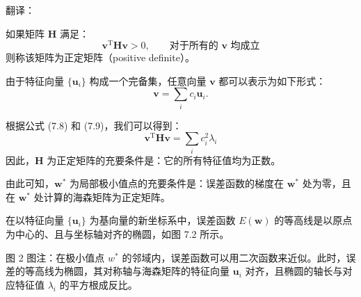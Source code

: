 \documentclass{article}
\begin{document}
{\color{red}
翻译：

如果矩阵 $\mathbf{H}$ 满足：
\begin{equation}
\mathbf{v}^\mathrm{T} \mathbf{H} \mathbf{v} > 0, \qquad \text{对于所有的 } \mathbf{v} \text{ 均成立}
\tag{7.12}
\end{equation}
则称该矩阵为正定矩阵（positive definite）。

由于特征向量 $\{\mathbf{u}_i\}$ 构成一个完备集，任意向量 $\mathbf{v}$ 都可以表示为如下形式：
\begin{equation}
\mathbf{v} = \sum_i c_i \mathbf{u}_i.
\tag{7.13}
\end{equation}

根据公式 (7.8) 和 (7.9)，我们可以得到：
\begin{equation}
\mathbf{v}^\mathrm{T} \mathbf{H} \mathbf{v} = \sum_i c_i^2 \lambda_i
\tag{7.14}
\end{equation}
因此，$\mathbf{H}$ 为正定矩阵的充要条件是：它的所有特征值均为正数。

由此可知，$\mathbf{w}^*$ 为局部极小值点的充要条件是：误差函数的梯度在 $\mathbf{w}^*$ 处为零，且在 $\mathbf{w}^*$ 处计算的海森矩阵为正定矩阵。

在以特征向量 $\{\mathbf{u}_i\}$ 为基向量的新坐标系中，误差函数 $E(\mathbf{w})$ 的等高线是以原点为中心的、且与坐标轴对齐的椭圆，如图 7.2 所示。

图 2 图注：在极小值点 $w^*$ 的邻域内，误差函数可以用二次函数来近似。此时，误差的等高线为椭圆，其对称轴与海森矩阵的特征向量 $\mathbf{u}_i$ 对齐，且椭圆的轴长与对应特征值 $\lambda_i$ 的平方根成反比。
}
\end{document}
